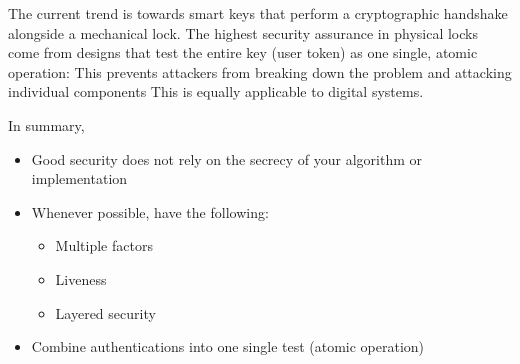 \documentclass[../notes.tex]{subfiles}
\begin{document}
The current trend is towards smart keys that perform a cryptographic handshake alongside a mechanical lock. The highest security assurance in physical locks come from designs that test the entire key (user token) as one single, atomic operation: This prevents attackers from breaking down the problem and attacking individual components This is equally applicable to digital systems.

In summary,

\begin{itemize}
    \item Good security does not rely on the secrecy of your algorithm or implementation
    \item Whenever possible, have the following:
        \begin{itemize}
            \item Multiple factors
            \item Liveness
            \item Layered security
        \end{itemize}
    \item Combine authentications into one single test (atomic operation)
\end{itemize}
\end{document}
